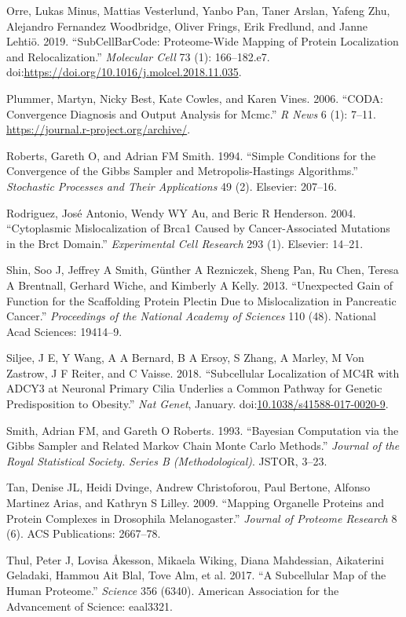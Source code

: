 \documentclass[]{article}
\begin{document}
\hypertarget{ref-Orre:2019}{}
Orre, Lukas Minus, Mattias Vesterlund, Yanbo Pan, Taner Arslan, Yafeng
Zhu, Alejandro Fernandez Woodbridge, Oliver Frings, Erik Fredlund, and
Janne Lehtiö. 2019. ``SubCellBarCode: Proteome-Wide Mapping of Protein
Localization and Relocalization.'' \emph{Molecular Cell} 73 (1):
166--182.e7.
doi:\href{https://doi.org/https://doi.org/10.1016/j.molcel.2018.11.035}{https://doi.org/10.1016/j.molcel.2018.11.035}.

\hypertarget{ref-coda}{}
Plummer, Martyn, Nicky Best, Kate Cowles, and Karen Vines. 2006. ``CODA:
Convergence Diagnosis and Output Analysis for Mcmc.'' \emph{R News} 6
(1): 7--11. \url{https://journal.r-project.org/archive/}.

\hypertarget{ref-Roberts:1994}{}
Roberts, Gareth O, and Adrian FM Smith. 1994. ``Simple Conditions for
the Convergence of the Gibbs Sampler and Metropolis-Hastings
Algorithms.'' \emph{Stochastic Processes and Their Applications} 49 (2).
Elsevier: 207--16.

\hypertarget{ref-Rodriguez:2004}{}
Rodriguez, José Antonio, Wendy WY Au, and Beric R Henderson. 2004.
``Cytoplasmic Mislocalization of Brca1 Caused by Cancer-Associated
Mutations in the Brct Domain.'' \emph{Experimental Cell Research} 293
(1). Elsevier: 14--21.

\hypertarget{ref-Shin:2013}{}
Shin, Soo J, Jeffrey A Smith, Günther A Rezniczek, Sheng Pan, Ru Chen,
Teresa A Brentnall, Gerhard Wiche, and Kimberly A Kelly. 2013.
``Unexpected Gain of Function for the Scaffolding Protein Plectin Due to
Mislocalization in Pancreatic Cancer.'' \emph{Proceedings of the
National Academy of Sciences} 110 (48). National Acad Sciences:
19414--9.

\hypertarget{ref-Siljee:2018}{}
Siljee, J E, Y Wang, A A Bernard, B A Ersoy, S Zhang, A Marley, M Von
Zastrow, J F Reiter, and C Vaisse. 2018. ``Subcellular Localization of
MC4R with ADCY3 at Neuronal Primary Cilia Underlies a Common Pathway for
Genetic Predisposition to Obesity.'' \emph{Nat Genet}, January.
doi:\href{https://doi.org/10.1038/s41588-017-0020-9}{10.1038/s41588-017-0020-9}.

\hypertarget{ref-Smith:1993}{}
Smith, Adrian FM, and Gareth O Roberts. 1993. ``Bayesian Computation via
the Gibbs Sampler and Related Markov Chain Monte Carlo Methods.''
\emph{Journal of the Royal Statistical Society. Series B
(Methodological)}. JSTOR, 3--23.

\hypertarget{ref-Tan:2009}{}
Tan, Denise JL, Heidi Dvinge, Andrew Christoforou, Paul Bertone, Alfonso
Martinez Arias, and Kathryn S Lilley. 2009. ``Mapping Organelle Proteins
and Protein Complexes in Drosophila Melanogaster.'' \emph{Journal of
Proteome Research} 8 (6). ACS Publications: 2667--78.

\hypertarget{ref-Thul:2017}{}
Thul, Peter J, Lovisa Åkesson, Mikaela Wiking, Diana Mahdessian,
Aikaterini Geladaki, Hammou Ait Blal, Tove Alm, et al. 2017. ``A
Subcellular Map of the Human Proteome.'' \emph{Science} 356 (6340).
American Association for the Advancement of Science: eaal3321.
\end{document}
